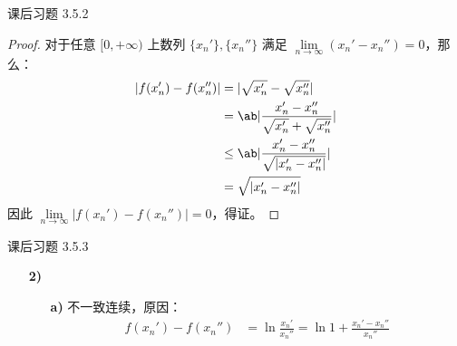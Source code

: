 \begin{problem}
	课后习题 3.5.2

	\begin{proof}
		对于任意 $[0, +\infty)$ 上数列 $\{x_n'\}, \{x_n''\}$ 满足 $\lim\limits_{n \to \infty} (x_n' - x_n'') = 0$，那么：
		$$
		\begin{aligned}
			|f(x_n') - f(x_n'')| & = |\sqrt{x_n'} - \sqrt{x_n''}| \\
			& = \ab|\frac{x_n' - x_n''}{\sqrt{x_n'} + \sqrt{x_n''}}| \\
			& \le \ab|\frac{x_n' - x_n''}{\sqrt{|x_n' - x_n''|}}| \\
			& = \sqrt{|x_n' - x_n''|}
		\end{aligned}
		$$
		因此 $\lim\limits_{n \to \infty} |f(x_n') - f(x_n'')| = 0$，得证。
	\end{proof}
\end{problem}

\begin{problem}
	课后习题 3.5.3

	\begin{solution}
		\begin{enumerate}
			\item[\textbf{2)}]
			\begin{enumerate}
				\item[\textbf{a)}] 不一致连续，原因：
				$$
				\begin{aligned}
					f(x_n') - f(x_n'') & = \ln{\frac{x_n'}{x_n''}} = \ln{1 + \frac{x_n' - x_n''}{x_n''}}
				\end{aligned}
				$$
			\end{enumerate}
		\end{enumerate}
	\end{solution}
\end{problem}